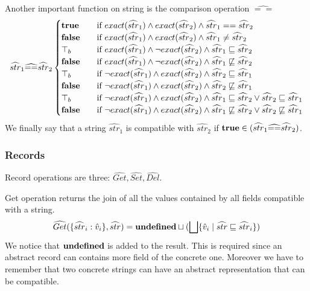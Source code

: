 Another important function on string is the comparison operation $\widehat{==}$
\newcommand{\strat}{\widehat{str}}
\begin{align*}
\strat_1 \widehat{==} \strat_2
\begin{cases}
\true & \quad\text{if}\ exact(\strat_1) \wedge exact(\strat_2) \wedge \strat_1 == \strat_2\\
\false & \quad\text{if}\ exact(\strat_1) \wedge exact(\strat_2) \wedge \strat_1 \neq \strat_2\\
\top_b & \quad\text{if}\ exact(\strat_1) \wedge \neg exact(\strat_2) \wedge \strat_1 \sqsubseteq \strat_2\\
\false & \quad\text{if}\ exact(\strat_1) \wedge \neg exact(\strat_2) \wedge \strat_1 \not\sqsubseteq \strat_2\\
\top_b & \quad\text{if}\ \neg exact(\strat_1) \wedge exact(\strat_2) \wedge \strat_2 \sqsubseteq \strat_1\\
\false & \quad\text{if}\ \neg exact(\strat_1) \wedge exact(\strat_2) \wedge \strat_2 \not\sqsubseteq \strat_1\\
\top_b & \quad\text{if}\ \neg exact(\strat_1) \wedge exact(\strat_2) \wedge \strat_1 \sqsubseteq \strat_2 \vee \strat_2 \sqsubseteq \strat_1\\
\false & \quad\text{if}\ \neg exact(\strat_1) \wedge exact(\strat_2) \wedge \strat_1 \not\sqsubseteq \strat_2 \vee \strat_2 \not\sqsubseteq \strat_1
\end{cases}
\end{align*}
We finally say that a string $\strat_1$ is compatible with $\strat_2$ if $\true \in (\strat_1 \widehat{==} \strat_2)$.

\subsubsection{Records}
Record operations are three: $\widehat{Get}, \widehat{Set}, \widehat{Del}$.

Get operation returns the join of all the values contained by all fields compatible with a string.
\begin{align*}
\widehat{Get}(\rec{\strat_i: \vat_i}, \strat) = \undef \join (\bigsqcup\{\vat_i \mid \strat \sqsubseteq \strat_i\})
\end{align*}
We notice that $\mathbf{undefined}$ is added to the result. This is required since an abstract record can contains more field of the concrete one. Moreover we have to remember that two concrete strings can have an abstract representation that can be compatible.

